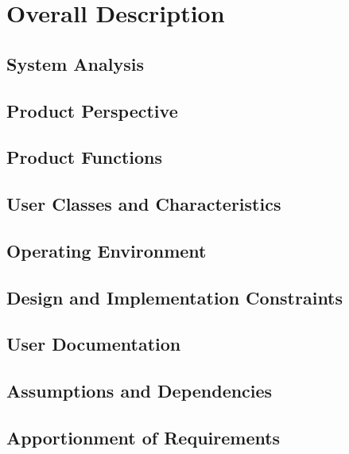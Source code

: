 \section{Overall Description}
\label{sec:overall}

\subsection{System Analysis}
\label{sec:analysis}

\subsection{Product Perspective}
\label{sec:perspective}

\subsection{Product Functions}
\label{sec:functions}

\subsection{User Classes and Characteristics}
\label{sec:classes}

\subsection{Operating Environment}
\label{sec:environment}

\subsection{Design and Implementation Constraints}
\label{sec:constraints}

\subsection{User Documentation}
\label{sec:documentation}

\subsection{Assumptions and Dependencies}
\label{sec:assumptions}

\subsection{Apportionment of Requirements}
\label{sec:apportionment}

